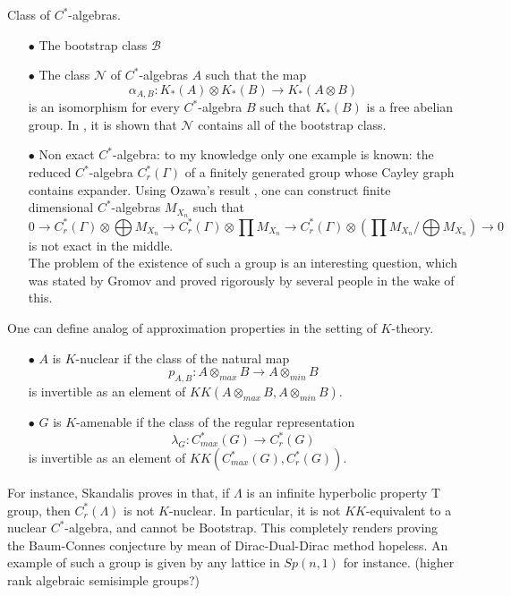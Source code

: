 Class of $C^*$-algebras.\\

\begin{itemize}
\item[$\bullet$] The bootstrap class $\mathcal B$ \\
\item[$\bullet$] The class $\mathcal N$ of $C^*$-algebras $A$ such that the map 
\[\alpha_{A,B}: K_*(A)\otimes K_*(B) \rightarrow K_*(A \otimes B)\]
is an isomorphism for every $C^*$-algebra $B$ such that $K_*(B)$ is a free abelian group. In \cite{schochetRosenberg}, it is shown that $\mathcal N$ contains all of the bootstrap class.\\
\item[$\bullet$] Non exact $C^*$-algebra: to my knowledge only one example is known: the reduced $C^*$-algebra $C_r^*(\Gamma) $ of a finitely generated group whose Cayley graph contains expander. Using Ozawa's result \cite{Ozawa}, one can construct finite dimensional $C^*$-algebras $M_{X_n}$ such that 
\[ 0 \rightarrow C_r^*(\Gamma) \otimes \bigoplus M_{X_n} \rightarrow C_r^*(\Gamma) \otimes \prod M_{X_n} \rightarrow C_r^*(\Gamma) \otimes \left(\prod M_{X_n} /  \bigoplus M_{X_n} \right) \rightarrow 0\] is not exact in the middle.\\ The problem of the existence of such a group is an interesting question, which was stated by Gromov and proved rigorously by several people in the wake of this.\\	
\end{itemize}

One can define analog of approximation properties in the setting of $K$-theory. \\

\begin{itemize}
\item[$\bullet$] $A$ is $K$-nuclear if the class of the natural map
\[ p_{A,B} : A\otimes_{max} B \rightarrow A\otimes_{min} B \]
is invertible as an element of $KK(A\otimes_{max} B,A\otimes_{min} B)$.\\
\item[$\bullet$] $G$ is $K$-amenable if the class of the regular representation
\[ \lambda_{G} : C_{max}^*(G) \rightarrow C_{r}^*(G) \]
is invertible as an element of $KK(C_{max}^*(G),C_{r}^*(G))$.\\
\end{itemize}

For instance, Skandalis proves in \cite{SkandalisNotion} that, if $\Lambda$ is an infinite hyperbolic property T group, then $C_r^*(\Lambda)$ is not $K$-nuclear. In particular, it is not $KK$-equivalent to a nuclear $C^*$-algebra, and cannot be Bootstrap. This completely renders proving the Baum-Connes conjecture by mean of Dirac-Dual-Dirac method hopeless. An example of such a group is given by any lattice in $Sp(n,1)$ for instance. (higher rank algebraic semisimple groups?) \\

